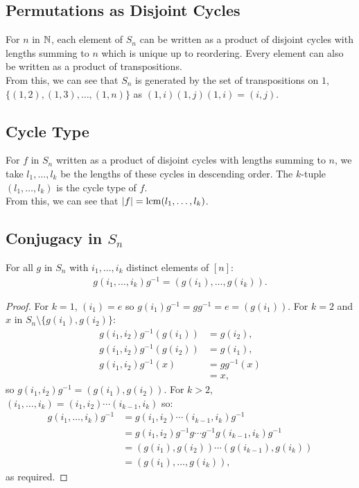 \subsection{Permutations as Disjoint Cycles} \label{4.1}

For $n$ in $\mathbb{N}$, each element of $S_n$ can be written as a product of
disjoint cycles with lengths summing to $n$ which is unique up to reordering.
Every element can also be written as a product of transpositions.
\\[\baselineskip]
From this, we can see that $S_n$ is generated by the set of transpositions on
$1$, $\{(1, 2), (1, 3), \ldots, (1, n)\}$ as $(1, i)(1, j)(1, i) = (i, j)$.

\subsection{Cycle Type} \label{4.2}

For $f$ in $S_n$ written as a product of disjoint cycles with lengths summing
to $n$, we take $l_1, \ldots, l_k$ be the lengths of these cycles in
descending order. The $k$-tuple $(l_1, \ldots, l_k)$ is the cycle type of $f$.
\\[\baselineskip]
From this, we can see that $|f| = \operatorname{lcm}(l_1, \ldots, l_k)$.

\subsection{Conjugacy in $S_n$} \label{4.4}

For all $g$ in $S_n$ with $i_1, \ldots, i_k$ distinct elements of $[n]$: 
\begin{align*}
    g(i_1, \ldots, i_k)g^{-1} = (g(i_1), \ldots, g(i_k)).
\end{align*}

\begin{proof}
    For $k = 1$, $(i_1) = e$ so $g(i_1)g^{-1} = gg^{-1} = e = (g(i_1))$.
    For $k = 2$ and $x$ in $S_n \setminus \{g(i_1), g(i_2)\}$: \begin{align*}
        g(i_1, i_2)g^{-1}(g(i_1)) 
        &= g(i_2), \\
        g(i_1, i_2)g^{-1}(g(i_2)) 
        &= g(i_1), \\
        g(i_1, i_2)g^{-1}(x) 
        &= gg^{-1}(x) \\
        &= x,
    \end{align*} so $g(i_1, i_2)g^{-1} = (g(i_1), g(i_2))$. For $k > 2$,
    $(i_1, \ldots, i_k) = (i_1, i_2)\cdots(i_{k - 1}, i_k)$ so: \begin{align*}
        g(i_1, \ldots, i_k)g^{-1} 
        &= g(i_1, i_2)\cdots(i_{k - 1}, i_k)g^{-1}\\
        &= g(i_1, i_2)g^{-1}g \cdots g^{-1}g(i_{k - 1}, i_k)g^{-1}\\
        &= (g(i_1), g(i_2)) \cdots (g(i_{k - 1}), g(i_k)) \\
        &= (g(i_1), \ldots, g(i_k)),
    \end{align*} as required.
\end{proof}

